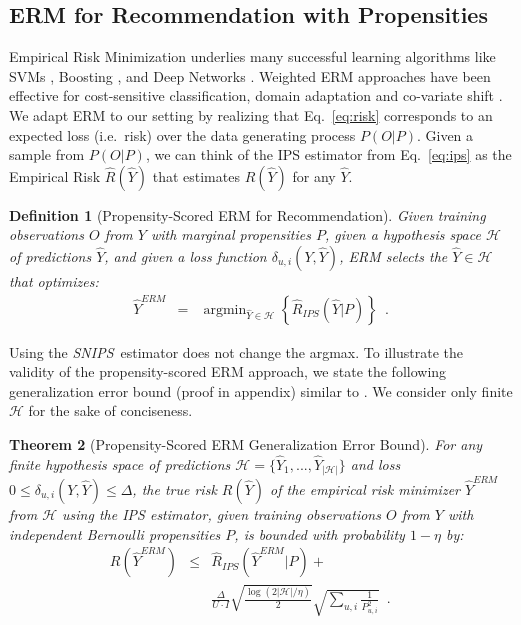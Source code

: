 \documentclass{article}
\newtheorem{theorem}{Theorem}[section]
\newtheorem{definition}[theorem]{Definition}
\DeclareMathOperator*{\argmin}{argmin}
\newcommand{\user}{u}                       %
\newcommand{\users}{U}                      %
\newcommand{\movie}{i}                      %
\newcommand{\movies}{I}                     %
\newcommand{\ytrue}{Y}                      %
\newcommand{\ypred}{\hat{Y}}                %
\newcommand{\loss}[3]{\delta_{#1}(#2,#3)}   %
\newcommand{\lossum}{\loss{\user,\movie}{\ytrue}{\ypred}}
\newcommand{\obs}{O}                        %
\newcommand{\probobs}{P}                    %
\newcommand{\probobselem}[1]{\probobs_{#1}}
\newcommand{\probobsum}{\probobselem{\user,\movie}}
\newcommand{\hypspace}{\mathcal{H}}         %
\newcommand{\risk}[1]{R(#1)}                %
\newcommand{\risky}{\risk{\ypred}}
\newcommand{\riskemp}[1]{\hat{R}(#1)}                %
\newcommand{\riskempy}{\riskemp{\ypred}}
\newcommand{\ipsest}[2]{\hat{R}_{IPS}(#1|#2)}      %
\newcommand{\ipsesty}{\ipsest{\ypred}{\probobs}}
\newcommand{\snips}{\emph{SNIPS}}
\begin{document}
\subsection{ERM for Recommendation with Propensities}
\label{sec:erm_prop}
Empirical Risk Minimization underlies many successful learning algorithms like SVMs \cite{Cortes/Vapnik/95a}, Boosting \cite{schapire}, and Deep Networks \cite{bengio2009deep}. Weighted ERM approaches have been effective for cost-sensitive classification, domain adaptation and co-variate shift \cite{Zadrozny/etal/03, Bickel/etal/09,Sugiyama/Kawanabe/12}. We adapt ERM to our setting by realizing that Eq.~\eqref{eq:risk} corresponds to an expected loss (i.e.\ risk) over the data generating process $P(\obs|\probobs)$.
Given a sample from $P(\obs|\probobs)$, we can think of the IPS estimator from Eq.~\eqref{eq:ips} as the Empirical Risk $\riskempy$ that estimates $\risky$ for any $\ypred$.
\begin{definition}[Propensity-Scored ERM for Recommendation]
Given training observations $\obs$ from $\ytrue$ with marginal propensities $\probobs$, given a hypothesis space $\hypspace$ of predictions $\ypred$, and given a loss function $\lossum$, ERM selects the $\ypred \in \hypspace$ that optimizes:
\vspace{-0.7em}
\begin{eqnarray}
     \ypred^{ERM} & = & \argmin_{\ypred \in \hypspace} \left\{ \ipsesty \right\} \enspace .
\end{eqnarray}
\end{definition}
\vspace{-1.2em}
Using the \snips\ estimator does not change the argmax. To illustrate the validity of the propensity-scored ERM approach, we state the following generalization error bound (proof in appendix) similar to \citet{Cortes/etal/10}. We consider only finite $\hypspace$ for the sake of conciseness.
\begin{theorem}[Propensity-Scored ERM Generalization Error Bound]
\label{thm:prop_erm}
For any finite hypothesis space of predictions $\hypspace=\{\ypred_1, ..., \ypred_{|\hypspace|}\}$ and loss $0 \le \lossum \le \Delta$, the true risk $\risky$ of the empirical risk minimizer $\ypred^{ERM}$ from $\hypspace$ using the IPS estimator, given training observations $\obs$ from $\ytrue$ with independent Bernoulli propensities $\probobs$, is bounded with probability $1-\eta$ by:
\begin{eqnarray}
\risk{\ypred^{ERM}} & \!\le\! & \ipsest{\ypred^{ERM}}{\probobs} + \nonumber \\
&& \frac{\Delta}{\users \!\cdot\! \movies} \sqrt{\frac{\log\left(2 |\hypspace| / \eta\right)}{2}} \sqrt{\sum_{\user,\movie} \frac{1}{\probobsum^2}}\enspace . \:\:\:\:\:\:\: \label{eq:ermbound}
\end{eqnarray}
\end{theorem}
\end{document}
